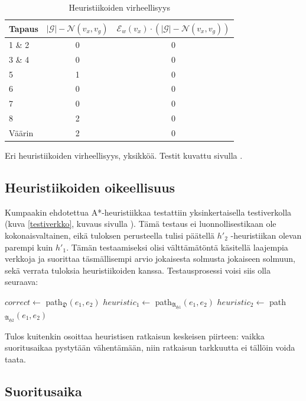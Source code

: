 \documentclass[10pt,a4paper]{article}
\begin{document}
\begin{table}
\begin{tabular}{l|c|c }
Tapaus & $ |\mathcal{G}| - \mathcal{N}( v_x , v_g )$  & $ \mathcal{E}_w ( v_x ) \cdot ( |\mathcal{G}| - \mathcal{N}( v_x , v_g ) ) $ \\ 
\hline 
1 \& 2 & 0 & 0 \\ 
3 \& 4 & 0 & 0 \\  
5 & 1 & 0 \\
6 & 0 & 0 \\
7 & 0 & 0 \\
8 & 2 & 0 \\
\hline
Väärin & 2 & 0 \\
\hline 
\end{tabular} 
\caption{Heuristiikoiden virheellisyys}
Eri heuristiikoiden virheellisyys, yksikköä. Testit kuvattu sivulla \pageref{network_test}.
\label{heuristic_correct}
\end{table}

\subsection{Heuristiikoiden oikeellisuus}
\label{heuristic_correctness}

Kumpaakin ehdotettua A*-heuristiikkaa testattiin yksinkertaisella testiverkolla (kuva \ref{testiverkko}, kuvaus sivulla \pageref{network_test}). Tämä testaus ei luonnollisestikaan ole kokonaisvaltainen, eikä tuloksen perusteella tulisi päätellä $h'_2$ -heuristiikan olevan parempi kuin $h'_1$. Tämän testaamiseksi olisi välttämätöntä käsitellä laajempia verkkoja ja suorittaa täsmällisempi arvio jokaisesta solmusta jokaiseen solmuun, sekä verrata tuloksia heuristiikoiden kanssa. Testausprosessi voisi siis olla seuraava:

\begin{algorithmic}
\State $correct \gets $ path$_\mathfrak{D}( e_1 , e_2 )$
\State $heuristic_1 \gets $ path$_\mathfrak{A_{H1}}( e_1 , e_2 )$
\State $heuristic_2 \gets $ path$_\mathfrak{A_{H2}}( e_1 , e_2 )$
\EndFor
\EndFor
\end{algorithmic}

Tulos kuitenkin osoittaa heuristisen ratkaisun keskeisen piirteen: vaikka suoritusaikaa pystytään vähentämään, niin ratkaisun tarkkuutta ei tällöin voida taata.

\subsection{Suoritusaika}
\label{suoritusaika}

 

\end{document}
